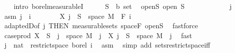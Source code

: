 \begin{isabellebody}
\ \ \isamarkupfalse%
\ {\isacharparenleft}{\kern0pt}intro\ borel{\isacharunderscore}{\kern0pt}measurableI{\isacharparenright}{\kern0pt}\isanewline
\ \ \ \ \isamarkupfalse%
\ S\ {\isacharcolon}{\kern0pt}{\isacharcolon}{\kern0pt}\ {\isachardoublequoteopen}{\isacharprime}{\kern0pt}b\ set{\isachardoublequoteclose}\ \isamarkupfalse%
\ open{\isacharunderscore}{\kern0pt}S{\isacharcolon}{\kern0pt}\ {\isachardoublequoteopen}open\ S{\isachardoublequoteclose}\isanewline
\ \ \ \ \isacommand{{\isacharbraceleft}{\kern0pt}}\isamarkupfalse%
\isanewline
\ \ \ \ \ \ \isamarkupfalse%
\ j\ \isamarkupfalse%
\ asm{\isacharcolon}{\kern0pt}\ {\isachardoublequoteopen}j\ {\isasymle}\ i{\isachardoublequoteclose}\isanewline
\ \ \ \ \ \ \isamarkupfalse%
\ {\isachardoublequoteopen}X\ j\ {\isacharminus}{\kern0pt}{\isacharbackquote}{\kern0pt}\ S\ {\isasyminter}\ space\ M\ {\isasymin}\ F\ i{\isachardoublequoteclose}\ \isamarkupfalse%
\ adaptedD{\isacharbrackleft}{\kern0pt}of\ j{\isacharcomma}{\kern0pt}\ THEN\ measurable{\isacharunderscore}{\kern0pt}sets{\isacharbrackright}{\kern0pt}\ space{\isacharunderscore}{\kern0pt}F\ open{\isacharunderscore}{\kern0pt}S\ \isamarkupfalse%
\ fastforce\isanewline
\ \ \ \ \ \ \isamarkupfalse%
\ \isamarkupfalse%
\ {\isachardoublequoteopen}case{\isacharunderscore}{\kern0pt}prod\ X\ {\isacharminus}{\kern0pt}{\isacharbackquote}{\kern0pt}\ S\ {\isasyminter}\ {\isacharbraceleft}{\kern0pt}j{\isacharbraceright}{\kern0pt}\ {\isasymtimes}\ space\ M\ {\isacharequal}{\kern0pt}\ {\isacharbraceleft}{\kern0pt}j{\isacharbraceright}{\kern0pt}\ {\isasymtimes}\ {\isacharparenleft}{\kern0pt}X\ j\ {\isacharminus}{\kern0pt}{\isacharbackquote}{\kern0pt}\ S\ {\isasyminter}\ space\ M{\isacharparenright}{\kern0pt}{\isachardoublequoteclose}\ \ j\ \isamarkupfalse%
\ fast\isanewline
\ \ \ \ \ \ \isamarkupfalse%
\ \isamarkupfalse%
\ {\isachardoublequoteopen}{\isacharbraceleft}{\kern0pt}j\ {\isacharcolon}{\kern0pt}{\isacharcolon}{\kern0pt}\ nat{\isacharbraceright}{\kern0pt}\ {\isasymin}\ restrict{\isacharunderscore}{\kern0pt}space\ borel\ {\isacharbraceleft}{\kern0pt}{}{\isachardot}{\kern0pt}{\isachardot}{\kern0pt}i{\isacharbraceright}{\kern0pt}{\isachardoublequoteclose}\ \isamarkupfalse%
\ asm\ \isamarkupfalse%
\ {\isacharparenleft}{\kern0pt}simp\ add{\isacharcolon}{\kern0pt}\ sets{\isacharunderscore}{\kern0pt}restrict{\isacharunderscore}{\kern0pt}space{\isacharunderscore}{\kern0pt}iff{\isacharparenright}{\kern0pt}\isanewline

\end{isabellebody}
